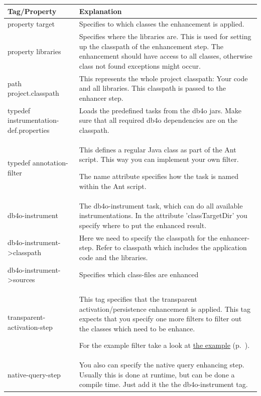 {\small
\begin{longtable}{|p{}|p{}|}
\hline
\textbf{Tag/Property} & \textbf{Explanation} \\ \hline
property target & Specifies to which classes the enhancement is applied. \\ \hline
property libraries & Specifies where the libraries are. This is used for setting up the classpath of the enhancement step. The enhancement should have access to all classes, otherwise class not found exceptions might occur. \\ \hline
path project.classpath & This represents the whole project classpath: Your code and all libraries. This classpath is passed to the enhancer step. \\ \hline
typedef instrumentation-def.properties & Loads the predefined tasks from the db4o jars. Make sure that all required db4o dependencies are on the classpath. \\ \hline
typedef annotation-filter & This defines a regular Java class as part of the Ant script. This way you can implement your own filter.\par The name attribute specifies how the task is named within the Ant script. \\ \hline
db4o-instrument & The db4o-instrument task, which can do all available instrumentations. In the attribute 'classTargetDir' you specify where to put the enhanced result. \\ \hline
db4o-instrument-\textgreater{}classpath & Here we need to specify the classpath for the enhancer-step. Refer to classpath which includes the application code and the libraries. \\ \hline
db4o-instrument-\textgreater{}sources & Specifies which class-files are enhanced \\ \hline
transparent-activation-step & This tag specifies that the transparent activation/persistence enhancement is applied. This tag expects that you specify one more filters to filter out the classes which need to be enhance.\par For the example filter take a look at \hyperref[ref:basics-transparentpersistence-ta-enhanced-example]{the example} (p.~\pageref{ref:basics-transparentpersistence-ta-enhanced-example}). \\ \hline
native-query-step & You also can specify the native query enhancing step. Usually this is done at runtime, but can be done a compile time. Just add it the the db4o-instrument tag. \\ \hline
\end{longtable}}

